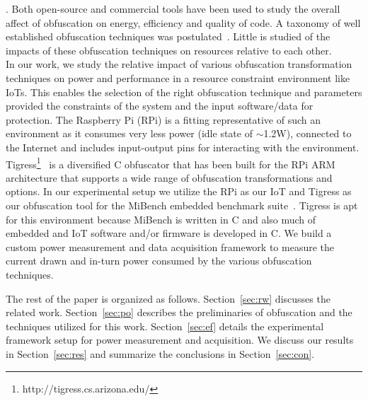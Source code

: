 . Both open-source and commercial tools have been used to study the overall affect of obfuscation on energy, efficiency and quality of code. A taxonomy of well established obfuscation techniques was postulated~\cite{collberg1997taxonomy}. Little is studied of the impacts of these obfuscation techniques on resources relative to each other.\\
\indent In our work, we study the relative impact of various obfuscation transformation techniques on power and performance in a resource constraint environment like IoTs. This enables the selection of the right obfuscation technique and parameters provided the constraints of the system and the input software/data for protection. The Raspberry Pi (RPi) is a fitting representative of such an environment as it consumes very less power (idle state of $\sim$1.2W), connected to the Internet and includes input-output pins for interacting with the environment. Tigress\footnote{http://tigress.cs.arizona.edu/}~\cite{Collberg2012Distributed} is a diversified C obfuscator that has been built for the RPi ARM architecture that supports a wide range of obfuscation transformations and options. In our experimental setup we utilize the RPi as our IoT and Tigress as our obfuscation tool for the MiBench embedded benchmark suite~\cite{990739}. Tigress is apt for this environment because MiBench is written in C and also much of embedded and IoT software and/or firmware is developed in C. We build a custom power measurement and data acquisition framework to measure the current drawn and in-turn power consumed by the various obfuscation techniques.

The rest of the paper is organized as follows. Section~\ref{sec:rw} discusses the related work. Section~\ref{sec:po} describes the preliminaries of obfuscation and the techniques utilized for this work. Section~\ref{sec:ef} details the experimental framework setup for power measurement and acquisition. We discuss our results in Section~\ref{sec:res} and summarize the conclusions in Section~\ref{sec:con}.

